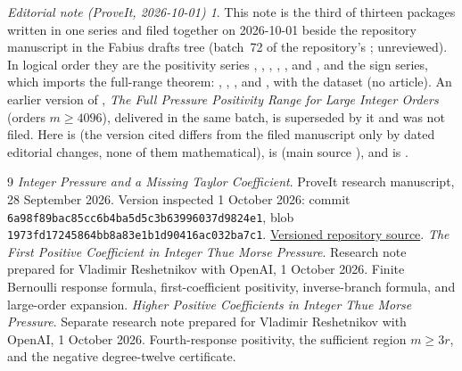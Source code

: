 \documentclass[11pt,a4paper]{article}
\theoremstyle{remark}\newtheorem*{ednote}{Editorial note (ProveIt, 2026-10-01)}
\begin{document}
\begin{ednote}
This note is the third of thirteen packages written in one series and filed together on 2026-10-01 beside the repository manuscript  in the Fabius drafts tree (batch~72 of the repository's ; unreviewed). In logical order they are the positivity series , , , , ,  and , and the sign series, which imports the full-range theorem: , , ,  and , with the dataset  (no article). An earlier version of , \emph{The Full Pressure Positivity Range for Large Integer Orders} (orders $m\ge4096$), delivered in the same batch, is superseded by it and was not filed.
Here \cite{integer} is  (the version cited differs from the filed manuscript only by dated editorial changes, none of them mathematical), \cite{first} is
 (main source ), and
\cite{higher} is .
\end{ednote}
\begin{thebibliography}{9}\small
{}\emph{Integer Pressure and a Missing Taylor Coefficient}. ProveIt research manuscript, 28 September 2026. Version inspected 1 October 2026: commit \nolinkurl{6a98f89bac85cc6b4ba5d5c3b63996037d9824e1}, blob \nolinkurl{1973fd17245864bb8a83e1b1d90416ac032ba7c1}.\newline
\href{https://github.com/VladimirReshetnikov/ProveIt/blob/6a98f89bac85cc6b4ba5d5c3b63996037d9824e1/Analysis/FabiusFunction/docs/semi-formalized-research-frontiers/drafts/thue-morse/Thue_Morse_Integer_Pressure/article.tex}{Versioned repository source}.
\emph{The First Positive Coefficient in Integer Thue Morse Pressure}. Research note prepared for Vladimir Reshetnikov with OpenAI, 1 October 2026. Finite Bernoulli response formula, first-coefficient positivity, inverse-branch formula, and large-order expansion.
\emph{Higher Positive Coefficients in Integer Thue Morse Pressure}. Separate research note prepared for Vladimir Reshetnikov with OpenAI, 1 October 2026. Fourth-response positivity, the sufficient region $m\ge3r$, and the negative degree-twelve certificate.
\end{thebibliography}
\end{document}
